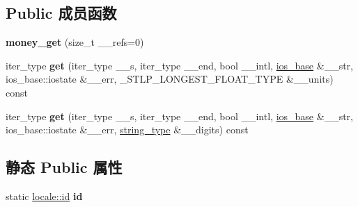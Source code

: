 \subsection*{Public 成员函数}
\begin{DoxyCompactItemize}
\item 
\mbox{\label{classmoney__get_a8e101772e44c3da56665f530798125d6}} 
{\bfseries money\+\_\+get} (size\+\_\+t \+\_\+\+\_\+refs=0)
\item 
\mbox{\label{classmoney__get_aa0bc9a805a546e0e4ad488f2b25333b6}} 
iter\+\_\+type {\bfseries get} (iter\+\_\+type \+\_\+\+\_\+s, iter\+\_\+type \+\_\+\+\_\+end, bool \+\_\+\+\_\+intl, \hyperlink{classios__base}{ios\+\_\+base} \&\+\_\+\+\_\+str, ios\+\_\+base\+::iostate \&\+\_\+\+\_\+err, \+\_\+\+S\+T\+L\+P\+\_\+\+L\+O\+N\+G\+E\+S\+T\+\_\+\+F\+L\+O\+A\+T\+\_\+\+T\+Y\+PE \&\+\_\+\+\_\+units) const
\item 
\mbox{\label{classmoney__get_a9cd11b3da4710258d32a187c4db573dc}} 
iter\+\_\+type {\bfseries get} (iter\+\_\+type \+\_\+\+\_\+s, iter\+\_\+type \+\_\+\+\_\+end, bool \+\_\+\+\_\+intl, \hyperlink{classios__base}{ios\+\_\+base} \&\+\_\+\+\_\+str, ios\+\_\+base\+::iostate \&\+\_\+\+\_\+err, \hyperlink{classbasic__string}{string\+\_\+type} \&\+\_\+\+\_\+digits) const
\end{DoxyCompactItemize}
\subsection*{静态 Public 属性}
\begin{DoxyCompactItemize}
\item 
\mbox{\label{classmoney__get_a70723110b205e6e71df63269384b0895}} 
static \hyperlink{classlocale_1_1id}{locale\+::id} {\bfseries id}
\end{DoxyCompactItemize}
